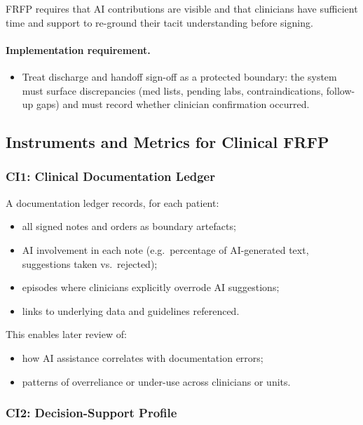 FRFP requires that AI contributions are visible and that clinicians have
sufficient time and support to re-ground their tacit understanding before
signing.
\paragraph{Implementation requirement.}
\begin{itemize}
  \item Treat discharge and handoff sign-off as a protected boundary: the system must surface discrepancies (med lists,
        pending labs, contraindications, follow-up gaps) and must record whether clinician confirmation occurred.
\end{itemize}
\subsection{Instruments and Metrics for Clinical FRFP}

\subsubsection*{CI1: Clinical Documentation Ledger}

A documentation ledger records, for each patient:

\begin{itemize}
  \item all signed notes and orders as boundary artefacts;
  \item AI involvement in each note (e.g.\ percentage of AI-generated text,
        suggestions taken vs.\ rejected);
  \item episodes where clinicians explicitly overrode AI suggestions;
  \item links to underlying data and guidelines referenced.
\end{itemize}

This enables later review of:

\begin{itemize}
  \item how AI assistance correlates with documentation errors;
  \item patterns of overreliance or under-use across clinicians or units.
\end{itemize}

\subsubsection*{CI2: Decision-Support Profile}

